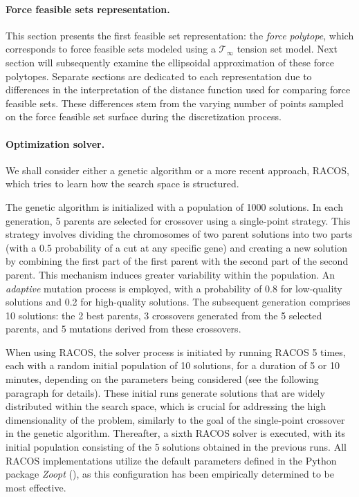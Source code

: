 \paragraph*{Force feasible sets representation.} This section presents the first feasible set representation: the \emph{force polytope}, which corresponds to force feasible sets modeled using a $\mathcal{T}_{\infty}$ tension set model. Next section will subsequently examine the ellipsoidal approximation of these force polytopes. Separate sections are dedicated to each representation due to differences in the interpretation of the distance function used for comparing force feasible sets. These differences stem from the varying number of points sampled on the force feasible set surface during the discretization process.

\paragraph*{Optimization solver.} We shall consider either a genetic algorithm or a more recent approach, RACOS, which tries to learn how the search space is structured.

The genetic algorithm is initialized with a population of 1000 solutions. In each generation, 5 parents are selected for crossover using a single-point strategy.  This strategy involves dividing the chromosomes of two parent solutions into two parts (with a 0.5 probability of a cut at any specific gene) and creating a new solution by combining the first part of the first parent with the second part of the second parent. This mechanism induces greater variability within the population.  An \emph{adaptive} mutation process is employed, with a probability of 0.8 for low-quality solutions and 0.2 for high-quality solutions. The subsequent generation comprises 10 solutions: the 2 best parents, 3 crossovers generated from the 5 selected parents, and 5 mutations derived from these crossovers.

When using RACOS, the solver process is initiated by running RACOS 5 times, each with a random initial population of 10 solutions, for a duration of 5 or 10 minutes, depending on the parameters being considered (see the following paragraph for details). These initial runs generate solutions that are widely distributed within the search space, which is crucial for addressing the high dimensionality of the problem, similarly to the goal of the single-point crossover in the genetic algorithm. Thereafter, a sixth RACOS solver is executed, with its initial population consisting of the 5 solutions obtained in the previous runs. All RACOS implementations utilize the default parameters defined in the Python package \emph{Zoopt} (\cite{yuDerivativeFreeOptimizationClassification2016}), as this configuration has been empirically determined to be most effective.

